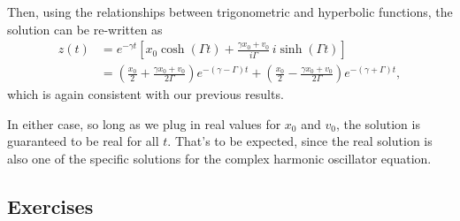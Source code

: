 \documentclass[10pt,a4paper]{article}
\begin{document}
Then, using the relationships between trigonometric and hyperbolic
functions, the solution can be re-written as
\begin{equation}
\begin{aligned}z(t) &= e^{-\gamma t} \left[x_0 \cosh(\Gamma t) + \frac{\gamma x_0 + v_0}{i\Gamma} \, i \sinh(\Gamma t)\right] \\ &= \left(\frac{x_0}{2} + \frac{\gamma x_0 + v_0}{2\Gamma}\right) e^{-(\gamma - \Gamma) t} + \left(\frac{x_0}{2} - \frac{\gamma x_0 + v_0}{2\Gamma}\right) e^{-(\gamma+\Gamma)t},\end{aligned}
\end{equation}
which is again consistent with our previous results.

In either case, so long as we plug in real values for $x_0$ and
$v_0$, the solution is guaranteed to be real for all $t$. That's to
be expected, since the real solution is also one of the specific
solutions for the complex harmonic oscillator equation.

\subsection{Exercises}\label{exercises}
\end{document}
